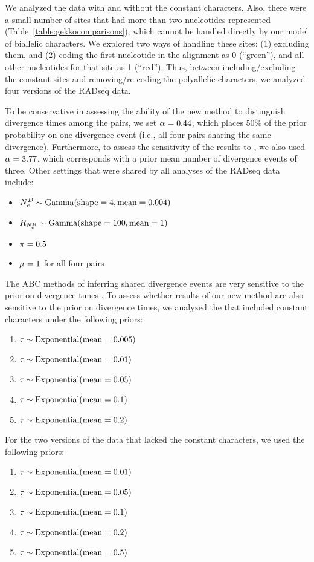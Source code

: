 We analyzed the data with and without the constant characters.
Also, there were a small number of sites that had more than two nucleotides
represented
(Table~\ref{table:gekkocomparisons}),
which cannot be handled directly by our model of biallelic characters.
We explored two ways of handling these sites:
(1) excluding them, and
(2) coding the first nucleotide in the alignment as 0 (``green''), and all
other nucleotides for that site as 1 (``red'').
Thus, between including/excluding the constant sites and removing/re-coding the
polyallelic characters, we analyzed four versions of the RADseq data.

To be conservative in assessing the ability of the new method to distinguish
divergence times among the pairs, we set $\concentration = 0.44$, which places
50\% of the prior probability on one divergence event (i.e., all four pairs
sharing the same divergence).
Furthermore, to assess the sensitivity of the results to \concentration, we
also used $\concentration = 3.77$, which corresponds with a prior mean number
of divergence events of three.
Other settings that were shared by all analyses of the  RADseq data
include:
\begin{itemize}
    \item $\epopsize[\descendantpopindex{}] \sim \dgamma{4}{0.004}$
    \item $\rootrelativepopsize \sim \dgamma{100}{1}$
    \item $\gfreq = 0.5$
    \item $\murate = 1$ for all four pairs
\end{itemize}

The ABC methods of inferring shared divergence events are very sensitive to the
prior on divergence times
\citep{Oaks2012,Hickerson2013,Oaks2014reply,Oaks2014dpp}.
To assess whether results of our new method are also sensitive to the
prior on divergence times, we analyzed the \datasets that included constant
characters under the following priors:
\begin{enumerate}
    \item $\divtime \sim \dexponential{0.005}$
    \item $\divtime \sim \dexponential{0.01}$
    \item $\divtime \sim \dexponential{0.05}$
    \item $\divtime \sim \dexponential{0.1}$
    \item $\divtime \sim \dexponential{0.2}$
\end{enumerate}
For the two versions of the  data that lacked the constant
characters, we used the following priors:
\begin{enumerate}
    \item $\divtime \sim \dexponential{0.01}$
    \item $\divtime \sim \dexponential{0.05}$
    \item $\divtime \sim \dexponential{0.1}$
    \item $\divtime \sim \dexponential{0.2}$
    \item $\divtime \sim \dexponential{0.5}$
\end{enumerate}

